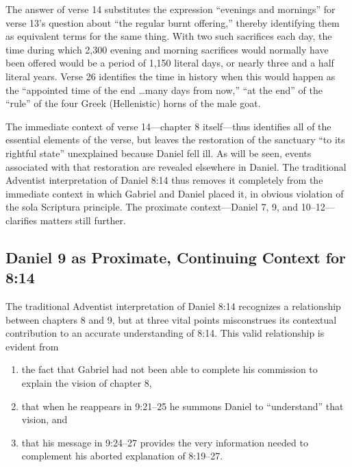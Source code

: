 The answer of verse 14 substitutes the expression ``evenings and mornings''
for verse 13's question about ``the regular burnt offering,'' thereby
identifying them as equivalent terms for the same thing. With two such
sacrifices each day, the time during which 2,300 evening and morning
sacrifices would normally have been offered would be a period of 1,150
literal days, or nearly three and a half literal years. Verse 26 identifies
the time in history when this would happen as the ``appointed time of the end
\ldots many days from now,'' ``at the end'' of the ``rule'' of the four Greek
(Hellenistic) horns of the male goat.

The immediate context of verse 14---chapter 8 itself---thus identifies all
of the essential elements of the verse, but leaves the restoration of
the sanctuary ``to its rightful state'' unexplained because Daniel fell
ill. As will be seen, events associated with that restoration are
revealed elsewhere in Daniel. The traditional Adventist interpretation of
Daniel 8:14 thus removes it completely from the immediate context in which
Gabriel and Daniel placed it, in obvious violation of the sola Scriptura 
principle. The proximate context---Daniel 7, 9, and 10--12---clarifies
matters still further.

\subsection{Daniel 9 as Proximate, Continuing Context for 8:14}

The traditional Adventist interpretation of Daniel 8:14 recognizes a
relationship between chapters 8 and 9, but at three vital points
misconstrues its contextual contribution to an accurate understanding of
8:14. This valid relationship is evident from
\begin{enumerate}
	\item the fact that
Gabriel had not been able to complete his commission to explain the vision
        of chapter 8, 
	\item that when he reappears in 9:21--25 he summons Daniel to
``understand'' that vision, and 
	\item that his message in 9:24--27 provides the
very information needed to complement his aborted explanation of 8:19--27.
\end{enumerate}

